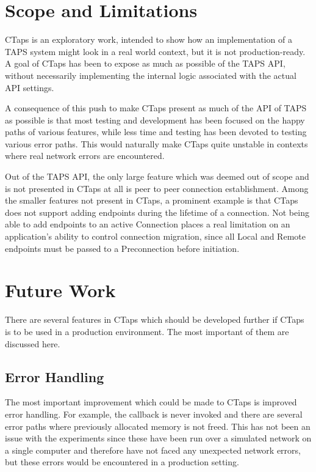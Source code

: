 \section{Scope and Limitations}
CTaps is an exploratory work, intended to show how an implementation of a TAPS
system might look in a real world context, but it is not production-ready.
A goal of CTaps has been to expose as much as possible of
the TAPS API, without necessarily implementing the internal logic associated with
the actual API settings.

A consequence of this push to make CTaps present as much of the API of TAPS
as possible is that most testing and development has been focused on the
happy paths of various features, while less time and testing has been devoted
to testing various error paths. This would naturally make CTaps quite
unstable in contexts where real network errors are encountered.

Out of the TAPS API, the only large feature which was deemed out of scope
and is not presented in CTaps at all is peer to peer connection establishment.
Among the smaller features not present in CTaps, a prominent example is that CTaps
does not support adding endpoints during the lifetime of a connection.
Not being able to add endpoints to an active Connection places a real limitation on
an application's ability to control connection migration, since all Local and Remote
endpoints must be passed to a Preconnection before initiation.

\section{Future Work}\label{sec:future-work}
There are several features in CTaps which should be developed
further if CTaps is to be used in a production environment.
The most important of them are discussed here.

\subsection{Error Handling}
The most important improvement which could be made to CTaps is improved error handling.
For example, the  callback is never invoked and
there are several error paths where previously allocated memory is not freed.
This has not been an issue with the experiments since these have been run over
a simulated network on a single computer and therefore have not faced any unexpected network
errors, but these errors would be encountered in a production setting.

